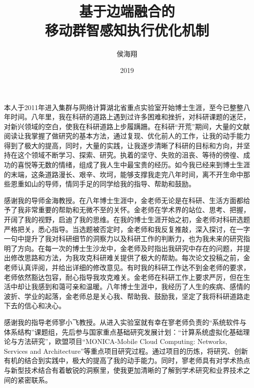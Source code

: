 \documentclass[format=draft,language=chinese,degree=phd,table,usenames,dvipsnames]{hustthesis}
\title{基于边端融合的\\移动群智感知执行优化机制}{Execution Optimization Mechanisms for \protect{\\} Edge Computing empowered Mobile Crowdsensing}
\author{侯海翔}{Haixiang Hou}
\date{2019}{6}{1}
\begin{document}
\frontmatter
\maketitle
\makeabstract
\tableofcontents
\listoffigures
\listoftables
\mainmatter













\begin{ack}

本人于2011年进入集群与网络计算湖北省重点实验室开始博士生涯，至今已整整八年时间。八年里，我在科研的道路上遇到过许多困难和挫折，对科研课题的迷茫，对新兴领域的空白，使我在科研道路上步履蹒跚。在科研“开荒”期间，大量的文献阅读让我掌握了做研究的基本方法，通过复现、优化前人的工作，让我的动手能力得到了极大的提高，同时，大量的实践，让我逐步清晰了科研的目标和方向，并坚持在这个领域不断学习、探索、研究。执着的坚守、失败的沮丧、等待的徬徨、成功的喜悦等无数的情绪，组成了我人生中最宝贵的经历。如今我已经来到博士生涯的末端，这条道路漫长、艰辛、坎坷，能够支撑我走完八年时间，离不开生命中那些恩重如山的导师，情同手足的同学给我的指导、帮助和鼓励。

感谢我的导师金海教授。在八年博士生涯中，金老师无论是在科研、生活方面都给予了我非常重要的帮助和无微不至的关怀。金老师在学术界的站位、思考、把握，开阔了我的视野，启迪了我的思维。在我的博士生涯开始之初，金老师对科研选题严格把关，悉心指导。当选题被否定时，金老师和我反复推敲，深入探讨，在一字一句中提升了我对科研细节的洞察力以及科研工作的判断力，也为我未来的研究指明了方向。在每一次的博士生沙龙中，金老师及时指出我研究中存在的问题，并提出修改思路和方法，为我攻克科研难关提供了极大的帮助。每次论文投稿之前，金老师认真评阅，并给出详细的修改意见。有时我的科研工作达不到金老师的要求，老师依然豁达包容，耐心指导我攻克难关。金老师在科研工作上要求严厉，但在生活中却让我感到和蔼可亲和温暖。八年博士生涯中，我经历了人生的疾病、感情的波折、学业的起落，金老师总是关心我、帮助我、鼓励我，坚定了我将科研道路走下去的信心和决心。

感谢我的指导老师寥小飞教授。从进入实验室就有幸在寥老师负责的“系统软件与体系结构”课题组，先后参与国家重点基础研究发展计划：“计算系统虚拟化基础理论与方法研究”，欧盟项目“MONICA-Mobile Cloud Computing: Networks, Services and Architecture”等重点项目研究过程。通过项目的历炼，将研究、创新有机的结合到实践中，极大的提高了我的动手能力。同时，寥老师具有对学术热点与新型技术结合有着敏锐的洞察里，使我更加清晰的了解到学术研究和业界技术之间的紧密联系。


\end{ack}
\end{document}
